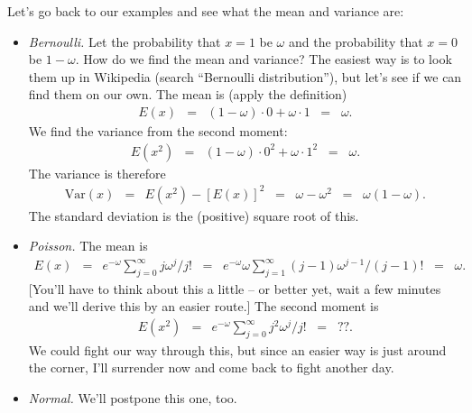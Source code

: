 \documentclass[11pt]{article}
\begin{document}
Let's go back to our examples and see what the mean and variance are:
%
\begin{itemize}
\item {\it Bernoulli.\/}
Let the probability that $x=1$ be $\omega$ and the probability that $x=0$ be $1-\omega$.
How do we find the mean and variance?
The easiest way is to look them up in Wikipedia (search ``Bernoulli distribution''),
but let's see if we can find them on our own.
The mean is (apply the definition)
\begin{eqnarray*}
    E(x) &=&  (1-\omega) \cdot 0 + \omega \cdot 1
            \;\;=\;\; \omega.
\end{eqnarray*}
We find the variance from the second moment:
\begin{eqnarray*}
    E(x^2) &=&  (1-\omega) \cdot 0^2 + \omega \cdot 1^2
            \;\;=\;\; \omega.
\end{eqnarray*}
The variance is therefore
\begin{eqnarray*}
    \mbox{Var}(x) &=& E(x^2) - [E(x)]^2
            \;\;=\;\;  \omega - \omega^2
            \;\;=\;\; \omega (1-\omega) .
\end{eqnarray*}
The standard deviation is the (positive) square root of this.


\item {\it Poisson.\/}
The mean is
\begin{eqnarray*}
    E(x) &=& e^{-\omega} \sum_{j=0}^\infty j \omega^j/j!
            \;\;=\;\; e^{-\omega} \omega \sum_{j=1}^\infty (j-1) \omega^{j-1}/(j-1)!
            \;\;=\;\; \omega .
\end{eqnarray*}
[You'll have to think about this a little -- or better yet, wait a few minutes and
we'll derive this by an easier route.]
The second moment is
\begin{eqnarray*}
    E(x^2) &=& e^{-\omega} \sum_{j=0}^\infty j^2 \omega^j/j!
            \;\;=\;\;  ??.
\end{eqnarray*}
We could fight our way through this,
but since an easier way is just around the corner,
I'll surrender now and come back to fight another day.


\item {\it Normal.\/}
We'll postpone this one, too.
\end{itemize}
\end{document}
